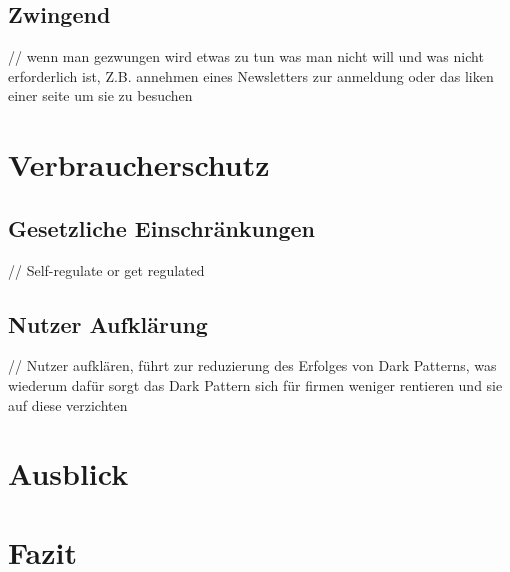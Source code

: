 \documentclass[conference,compsoc,final,a4paper]{IEEEtran}
\begin{document}
\subsection{Zwingend}
// wenn man gezwungen wird etwas zu tun was man nicht will und was nicht erforderlich ist, Z.B. annehmen eines Newsletters zur anmeldung oder das liken einer seite um sie zu besuchen


\section{Verbraucherschutz}
\subsection{Gesetzliche Einschränkungen}
// Self-regulate or get regulated
\subsection{Nutzer Aufklärung}
// Nutzer aufklären, führt zur reduzierung des Erfolges von Dark Patterns, was wiederum dafür sorgt das Dark Pattern sich für firmen weniger rentieren und sie auf diese verzichten

\section{Ausblick}

\section{Fazit}

\nocite{*}
\printbibliography
\end{document}
